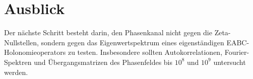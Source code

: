 \documentclass[11pt,a4paper]{article}
\begin{document}
	\section{Ausblick}
	
	Der nächste Schritt besteht darin, den Phasenkanal nicht gegen die Zeta-Nullstellen, sondern gegen das Eigenwertspektrum eines eigenständigen EABC-Holonomieoperators zu testen. Insbesondere sollten Autokorrelationen, Fourier-Spektren und Übergangsmatrizen des Phasenfeldes bis \(10^8\) und \(10^9\) untersucht werden.
	
\end{document}
